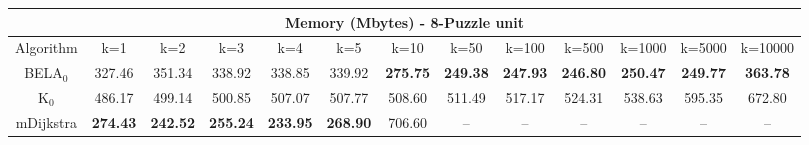 \begin{tabular}{c|cccccccccccc}\toprule
\multicolumn{13}{c}{Memory (Mbytes) - 8-Puzzle unit}\\ \midrule
Algorithm & k=1 & k=2 & k=3 & k=4 & k=5 & k=10 & k=50 & k=100 & k=500 & k=1000 & k=5000 & k=10000 \\ \midrule
BELA$_0$ & 327.46 & 351.34 & 338.92 & 338.85 & 339.92 & \textbf{275.75} & \textbf{249.38} & \textbf{247.93} & \textbf{246.80} & \textbf{250.47} & \textbf{249.77} & \textbf{363.78} \\
K$_0$ & 486.17 & 499.14 & 500.85 & 507.07 & 507.77 & 508.60 & 511.49 & 517.17 & 524.31 & 538.63 & 595.35 & 672.80 \\
mDijkstra & \textbf{274.43} & \textbf{242.52} & \textbf{255.24} & \textbf{233.95} & \textbf{268.90} & 706.60 & -- & -- & -- & -- & -- & -- \\ \bottomrule 
\end{tabular}
